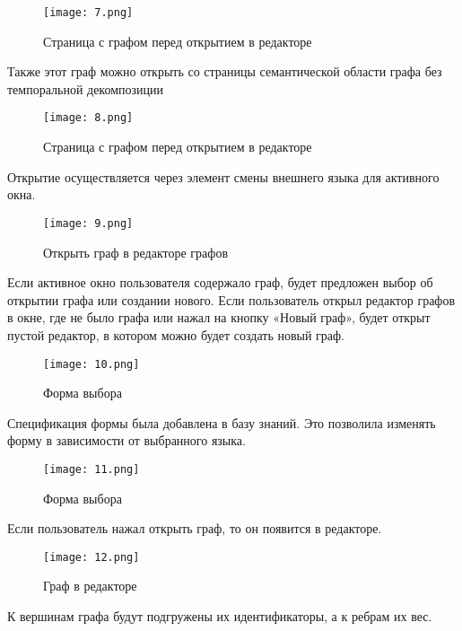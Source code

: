 \begin{figure}[H]
  \centering
  \texttt{[image: 7.png]}
  \caption{Страница с графом перед открытием в редакторе}
  \label{fig:hardware:sdr_pipeline}
\end{figure}

Также этот граф можно открыть со страницы семантической области графа без темпоральной декомпозиции

\begin{figure}[H]
  \centering
  \texttt{[image: 8.png]}
  \caption{Страница с графом перед открытием в редакторе}
  \label{fig:hardware:sdr_pipeline}
\end{figure}

Открытие осуществляется через элемент смены внешнего языка для активного окна.

\begin{figure}[H]
  \centering
  \texttt{[image: 9.png]}
  \caption{Открыть граф в редакторе графов}
  \label{fig:hardware:sdr_pipeline}
\end{figure}

Если активное окно пользователя содержало граф, будет предложен выбор об открытии графа или создании нового. Если пользователь открыл редактор графов в окне, где не было графа или нажал на кнопку «Новый граф», будет открыт пустой редактор, в котором можно будет создать новый граф.

\begin{figure}[H]
  \centering
  \texttt{[image: 10.png]}
  \caption{Форма выбора}
  \label{fig:hardware:sdr_pipeline}
\end{figure}

Спецификация формы была добавлена в базу знаний. Это позволила изменять форму в зависимости от выбранного языка.

\begin{figure}[H]
  \centering
  \texttt{[image: 11.png]}
  \caption{Форма выбора}
  \label{fig:hardware:sdr_pipeline}
\end{figure}

Если пользователь нажал открыть граф, то он появится в редакторе.

\begin{figure}[H]
  \centering
  \texttt{[image: 12.png]}
  \caption{Граф в редакторе}
  \label{fig:hardware:sdr_pipeline}
\end{figure}

К вершинам графа будут подгружены их идентификаторы, а к ребрам их вес.

